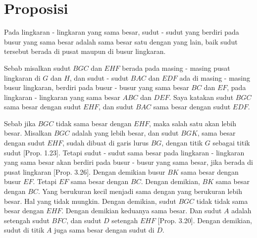 \documentclass[a4paper]{book}
\begin{document}
\section*{\centering Proposisi \thesection}

Pada lingkaran - lingkaran yang sama besar, sudut - sudut yang berdiri
pada busur yang sama besar adalah sama besar satu dengan yang lain, baik
sudut tersebut berada di pusat maupun di busur lingkaran.

\begin{center}
\end{center}

Sebab misalkan sudut $BGC$ dan $EHF$ berada pada masing - masing  pusat lingkaran di $G$ dan $H$, dan sudut - sudut $BAC$ dan $EDF$ ada di masing - masing busur
lingkaran, berdiri pada busur - busur yang sama besar $BC$ dan $EF$, pada 
lingkaran - lingkaran yang sama besar $ABC$ dan $DEF$. Saya katakan sudut
$BGC$ sama besar dengan sudut $EHF$, dan sudut $BAC$ sama besar dengan sudut
$EDF$.

Sebab jika $BGC$ tidak sama besar dengan $EHF$, maka salah satu akan lebih besar.
Misalkan $BGC$ adalah yang lebih besar, dan sudut $BGK$, sama besar dengan sudut
$EHF$, sudah dibuat di garis lurus $BG$, dengan titik $G$ sebagai titik sudut
[Prop. 1.23]. Tetapi sudut - sudut sama besar pada lingkaran - lingkaran yang
sama besar akan berdiri pada busur - busur yang sama besar, jika berada di pusat
lingkaran [Prop. 3.26]. Dengan demikian busur $BK$ sama besar dengan busur $EF$.
Tetapi $EF$ sama besar dengan $BC$. Dengan demikian, $BK$ sama besar dengan $BC$.
Yang berukuran kecil menjadi sama dengan yang berukuran lebih besar. Hal yang
tidak mungkin. Dengan demikian, sudut $BGC$ tidak tidak sama besar dengan $EHF$.
Dengan demikian keduanya sama besar. Dan sudut $A$ adalah setengah sudut $BFC$,
dan sudut $D$ setengah $EHF$ [Prop. 3.20]. Dengan demikian, sudut di titik $A$
juga sama besar dengan sudut di $D$.
\end{document}
